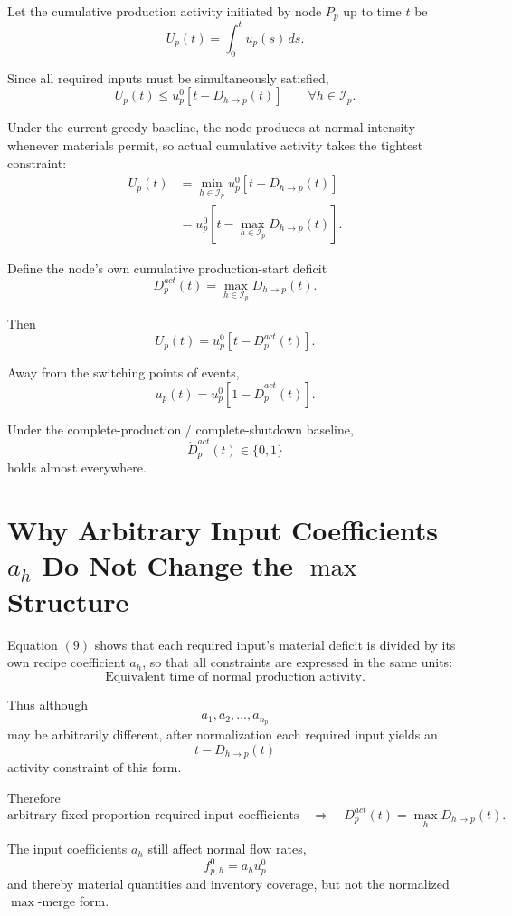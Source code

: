 \documentclass[11pt]{article}
\begin{document}
Let the cumulative production activity initiated by node \(P_p\) up to time \(t\) be
\[
\boxed{
U_p(t)=\int_0^t u_p(s)\,ds.
}
\tag{10}
\]

Since all required inputs must be simultaneously satisfied,
\[
U_p(t)
\le
u_p^0
\left[
t-D_{h\to p}(t)
\right]
\qquad
\forall h\in\mathcal I_p.
\]

Under the current greedy baseline,
the node produces at normal intensity whenever materials permit, so actual cumulative activity takes the tightest constraint:
\[
\begin{aligned}
U_p(t)
&=
\min_{h\in\mathcal I_p}
u_p^0
\left[
t-D_{h\to p}(t)
\right]
\\
&=
u_p^0
\left[
t-
\max_{h\in\mathcal I_p}
D_{h\to p}(t)
\right].
\end{aligned}
\tag{11}
\]

Define the node's own cumulative production-start deficit
\[
\boxed{
D_p^{act}(t)
=
\max_{h\in\mathcal I_p}
D_{h\to p}(t).
}
\tag{12}
\]

Then
\[
\boxed{
U_p(t)
=
u_p^0
\left[
t-D_p^{act}(t)
\right].
}
\tag{13}
\]

Away from the switching points of events,
\[
\boxed{
u_p(t)
=
u_p^0
\left[
1-\dot D_p^{act}(t)
\right].
}
\tag{14}
\]

Under the complete-production / complete-shutdown baseline,
\[
\dot D_p^{act}(t)\in\{0,1\}
\]
holds almost everywhere.

\section{Why Arbitrary Input Coefficients \(a_h\) Do Not Change the \(\max\) Structure}

Equation \((9)\) shows that
each required input's material deficit is divided by its own recipe coefficient \(a_h\),
so that all constraints are expressed in the same units:
\[
\boxed{\text{Equivalent time of normal production activity}.}
\]

Thus although
\[
a_1,a_2,\ldots,a_{n_p}
\]
may be arbitrarily different,
after normalization each required input yields an
\[
t-D_{h\to p}(t)
\]
activity constraint of this form.

Therefore
\[
\boxed{
\text{arbitrary fixed-proportion required-input coefficients}
\quad\Longrightarrow\quad
D_p^{act}(t)=\max_hD_{h\to p}(t).
}
\tag{15}
\]

The input coefficients \(a_h\) still affect normal flow rates,
\[
f_{p,h}^0=a_hu_p^0
\]
and thereby material quantities and inventory coverage,
but not the normalized \(\max\)-merge form.
\end{document}
